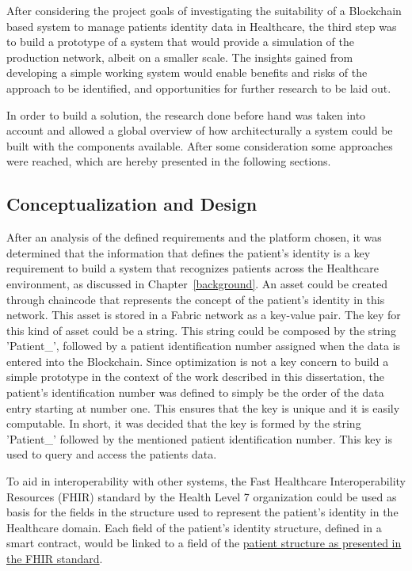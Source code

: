 After considering the project goals of investigating the suitability of a
Blockchain based system to manage patients identity data in Healthcare, the
third step was to build a prototype of a system that would provide a simulation
of the production network, albeit on a smaller scale. The insights gained from
developing a simple working system would enable benefits and risks of the
approach to be identified, and opportunities for further research to be laid
out.

In order to build a solution, the research done before hand was taken into
account and allowed a global overview of how architecturally a system could be
built with the components available. After some consideration some approaches
were reached, which are hereby presented in the following sections.

\subsection{Conceptualization and Design}

After an analysis of the defined requirements and the platform chosen, it was
determined that the information that defines the patient's identity is a key
requirement to build a system that recognizes patients across the Healthcare
environment, as discussed in Chapter~\ref{background}. An asset could be
created through chaincode that represents the concept of the patient's identity
in this network. This asset is stored in a Fabric network as a key-value pair.
The key for this kind of asset could be a string. This string could be composed
by the string 'Patient\_', followed by a patient identification number assigned
when the data is entered into the Blockchain. Since optimization is not a key
concern to build a simple prototype in the context of the work described in
this dissertation, the patient's identification number was defined to simply be
the order of the data entry starting at number one. This ensures that the key
is unique and it is easily computable. In short, it was decided that the key is
formed by the string 'Patient\_' followed by the mentioned patient
identification number. This key is used to query and access the patients data.

To aid in interoperability with other systems, the Fast Healthcare
Interoperability Resources (FHIR) standard by the Health Level 7 organization
could be used as basis for the fields in the structure used to represent the
patient's identity in the Healthcare domain.  Each field of the patient's
identity structure, defined in a smart contract, would be linked to a field of
the \href{http://www.hl7.org/fhir/patient.html}{patient structure as presented
in the FHIR standard}.

